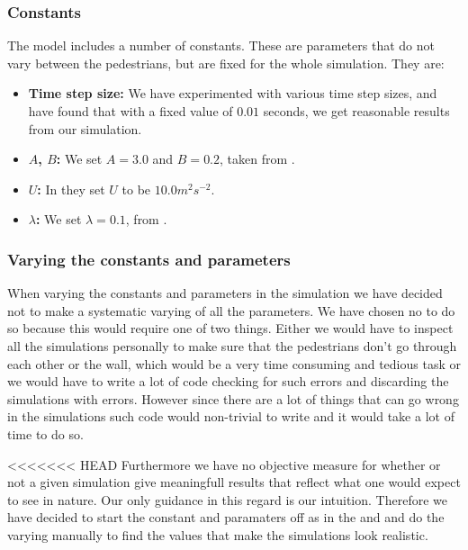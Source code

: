 \subsubsection{Constants} \label{constants}
The model includes a number of constants. These are parameters that do not 
vary between the pedestrians, but are fixed for the whole simulation. They are:

\begin{itemize}
    \item \textbf{Time step size:} We have experimented with various time step 
        sizes, and have found that with a fixed value of $0.01$ seconds, we 
        get reasonable results from our simulation.

    \item \textbf{$A$, $B$:} We set $A=3.0$ and $B=0.2$, taken from  
        \cite{ABconstant}.

    \item \textbf{$U$:} In \cite{social-force} they set $U$ to be $10.0 m^2 s^{-2}$.

 
    \item \textbf{$\lambda$:} We set $\lambda=0.1$, from 
            \cite{ABconstant}.
\end{itemize}

\subsubsection{Varying the constants and 
parameters}\label{sec:varying-constants}
When varying the constants and parameters in the simulation we have decided 
not to make a systematic varying of all the parameters. We have chosen no to 
do so because this would require one of two things.  Either we would have to 
inspect all the simulations personally to make sure that the pedestrians don't 
go through each other or the wall, which would be a very time consuming and 
tedious task or we would have to write a lot of code checking for such errors 
and discarding the simulations with errors. However since there are a lot of 
things that can go wrong in the simulations such code would non-trivial to 
write and it would take a lot of time to do so. 

<<<<<<< HEAD
Furthermore we have no objective measure for whether or 
not a given simulation give meaningfull results that reflect 
what one would expect to see in nature. Our only guidance in 
this regard is our intuition. Therefore we have decided to start 
the constant and paramaters off as in the \cite{self-org} and 
\cite{ABconstant} and do the varying manually to find the values 
that make the simulations look realistic.

